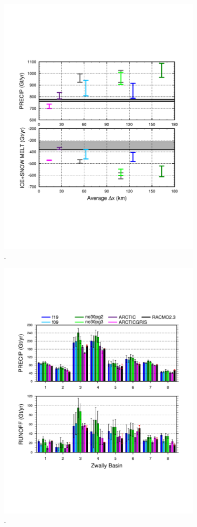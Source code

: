 \documentclass[draft]{agujournal2019}
\begin{document}
\begin{figure}[t]
\begin{center}
         \includegraphics[width=100mm]{figs/temp_climo_GRIS.pdf}
\end{center}
\caption{.}
\label{fig:climo}
\end{figure}

\begin{figure}[t]
\begin{center}
         \includegraphics[width=100mm]{figs/temp_tseries_BASIN_uqmap.pdf}
\end{center}
\caption{.}
\label{fig:zwally}
\end{figure}
\end{document}
